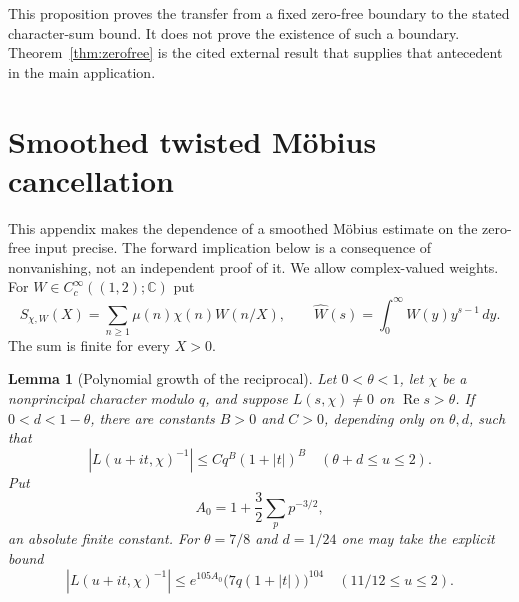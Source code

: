 \documentclass[screen,reqno]{aomart}
\numberwithin{equation}{section}
\newtheorem{lemma}[theorem]{Lemma}
\theoremstyle{definition}
\renewcommand{\Re}{\operatorname{Re}}
\newcommand{\C}{\mathbb{C}}
\begin{document}
This proposition proves the transfer from a fixed zero-free boundary to
the stated character-sum bound. It does not prove the existence of such a
boundary. Theorem~\ref{thm:zerofree} is the cited external result that supplies
that antecedent in the main application.

\section{Smoothed twisted M\"obius cancellation}
\label{app:mobius}

This appendix makes the dependence of a smoothed M\"obius estimate on the
zero-free input precise. The forward implication below is a consequence of
nonvanishing, not an independent proof of it. We allow complex-valued weights.
For $W\in C_c^\infty((1,2);\C)$ put
\[
 S_{\chi,W}(X)=\sum_{n\ge1}\mu(n)\chi(n)W(n/X),\qquad
 \widehat W(s)=\int_0^\infty W(y)y^{s-1}\,dy.
\]
The sum is finite for every $X>0$.

\begin{lemma}[Polynomial growth of the reciprocal]\label{lem:reciprocal}
Let $0<\theta<1$, let $\chi$ be a nonprincipal character modulo $q$, and
suppose $L(s,\chi)\ne0$ on $\Re s>\theta$. If $0<d<1-\theta$, there are
constants $B>0$ and $C>0$, depending only on $\theta,d$, such that
\[
 |L(u+it,\chi)^{-1}|\le Cq^B(1+|t|)^B
 \quad(\theta+d\le u\le2).
\]
Put
\[
 A_0=1+\frac32\sum_p p^{-3/2},
\]
an absolute finite constant. For $\theta=7/8$ and $d=1/24$ one may take the explicit bound
\begin{equation}\label{eq:reciprocal-explicit}
 |L(u+it,\chi)^{-1}|
 \le e^{105A_0}\bigl(7q(1+|t|)\bigr)^{104}
 \quad(11/12\le u\le2).
\end{equation}
\end{lemma}
\end{document}
